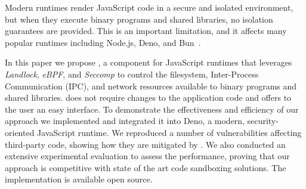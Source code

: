 Modern runtimes render JavaScript code in a secure and isolated
environment, but when they execute binary programs and shared
libraries, no isolation guarantees are provided. This is an important
limitation, and it affects many popular runtimes including Node.js,
Deno, and Bun~\cite{node-permissions,deno-permissions}.

In this paper we propose \pap, a component for JavaScript runtimes
that leverages {\em Landlock}, {\em eBPF}, and {\em Seccomp} to
control the filesystem, Inter-Process Communication (IPC), and network
resources available to binary programs and shared libraries.  \pap
does not require changes to the application code and offers to the
user an easy interface.
%
To demonstrate the effectiveness and efficiency of our approach we
implemented \pap and integrated it into Deno, a modern,
security-oriented JavaScript runtime. We reproduced a number of
vulnerabilities affecting third-party code, showing how they are
mitigated by \pap. We also conducted an extensive experimental
evaluation to assess the performance, proving that our approach is
competitive with state of the art code sandboxing solutions. The
implementation is available open source.

